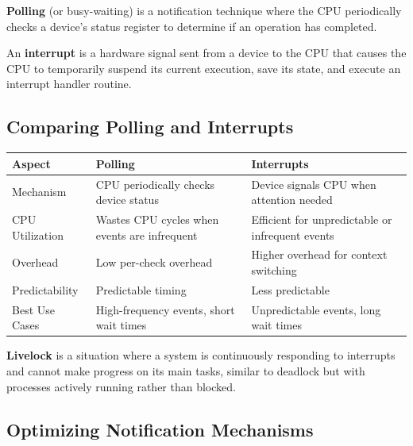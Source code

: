 \documentclass[../../compsys.tex]{subfiles}
\begin{document}
\begin{definition}[Polling]
\textbf{Polling} (or busy-waiting) is a notification technique where the CPU periodically checks a device's status register to determine if an operation has completed.
\end{definition}
\vspace{10px}
\begin{definition}[Interrupt]
An \textbf{interrupt} is a hardware signal sent from a device to the CPU that causes the CPU to temporarily suspend its current execution, save its state, and execute an interrupt handler routine.
\end{definition}

\subsection{Comparing Polling and Interrupts}

\begin{table}[h]
\centering
\begin{tabular}{|p{2.5cm}|p{5cm}|p{5cm}|}
\hline
\textbf{Aspect} & \textbf{Polling} & \textbf{Interrupts} \\
\hline
Mechanism & CPU periodically checks device status & Device signals CPU when attention needed \\
\hline
CPU Utilization & Wastes CPU cycles when events are infrequent & Efficient for unpredictable or infrequent events \\
\hline
Overhead & Low per-check overhead & Higher overhead for context switching \\
\hline
Predictability & Predictable timing & Less predictable \\
\hline
Best Use Cases & High-frequency events, short wait times & Unpredictable events, long wait times \\
\hline
\end{tabular}
\end{table}

\begin{definition}[Livelock]
\textbf{Livelock} is a situation where a system is continuously responding to interrupts and cannot make progress on its main tasks, similar to deadlock but with processes actively running rather than blocked.
\end{definition}

\subsection{Optimizing Notification Mechanisms}
\end{document}
